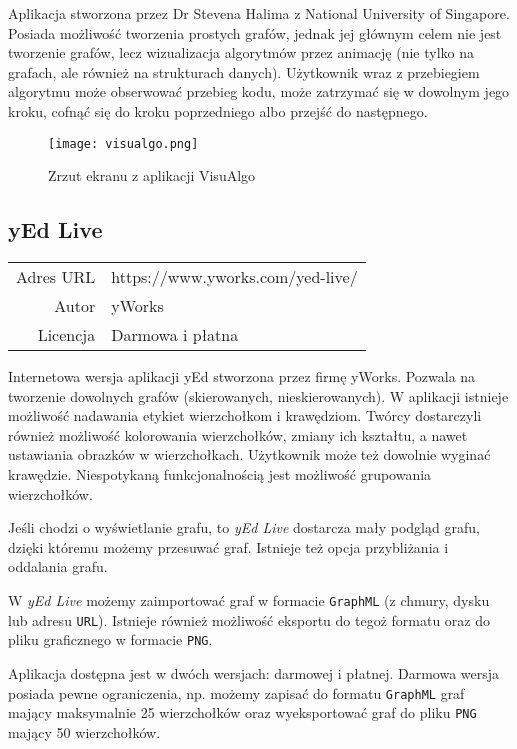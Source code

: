 Aplikacja stworzona przez Dr Stevena Halima z National University of Singapore. Posiada możliwość tworzenia prostych grafów, jednak jej głównym celem nie jest tworzenie grafów, lecz wizualizacja algorytmów przez animację (nie tylko na grafach, ale również na strukturach danych). Użytkownik wraz z przebiegiem algorytmu może obserwować przebieg kodu, może zatrzymać się w dowolnym jego kroku, cofnąć się do kroku poprzedniego albo przejść do następnego.

\begin{figure}[H]
\caption{Zrzut ekranu z aplikacji VisuAlgo}
\centering
\texttt{[image: visualgo.png]}
\end{figure}

\subsection*{yEd Live}
\bigskip
\noindent\begin{tabularx}{\textwidth}{r|X|}
\cline{2-2}
  Adres URL & https://www.yworks.com/yed-live/ \\ 
\cline{2-2} 
 Autor & yWorks\\ 
\cline{2-2}
 Licencja & Darmowa i płatna\\ 
\cline{2-2}
\end{tabularx}
\bigskip

Internetowa wersja aplikacji yEd stworzona przez firmę yWorks. Pozwala na tworzenie dowolnych grafów (skierowanych, nieskierowanych). W aplikacji istnieje możliwość nadawania etykiet wierzchołkom i krawędziom. Twórcy dostarczyli również możliwość kolorowania wierzchołków, zmiany ich kształtu, a nawet ustawiania obrazków w wierzchołkach. Użytkownik może też dowolnie wyginać krawędzie. Niespotykaną funkcjonalnością jest możliwość grupowania wierzchołków. 

Jeśli chodzi o wyświetlanie grafu, to \textit{yEd Live} dostarcza mały podgląd grafu, dzięki któremu możemy przesuwać graf. Istnieje też opcja przybliżania i oddalania grafu. 

W \textit{yEd Live} możemy zaimportować graf w formacie \texttt{GraphML} (z chmury, dysku lub adresu \texttt{URL}). Istnieje również możliwość eksportu do tegoż formatu oraz do pliku graficznego w formacie \texttt{PNG}. 

Aplikacja dostępna jest w dwóch wersjach: darmowej i płatnej. Darmowa wersja posiada pewne ograniczenia, np. możemy zapisać do formatu \texttt{GraphML} graf mający maksymalnie 25 wierzchołków oraz wyeksportować graf do pliku \texttt{PNG} mający 50 wierzchołków. 

